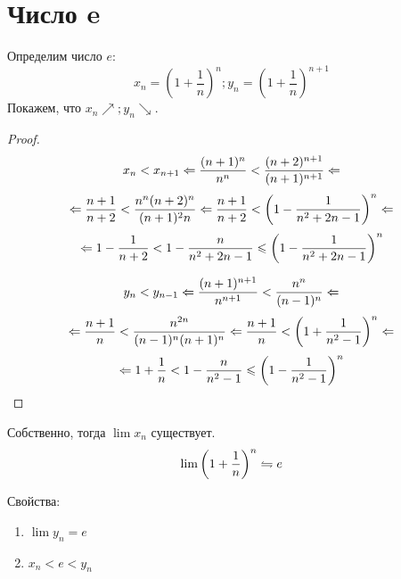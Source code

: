 ﻿\section{Число e}

Определим число $e$:
$$x_n = \left(1+\frac1n\right)^n; y_n=\left(1+\frac1n\right)^{n+1}$$
Покажем, что $x_n \nearrow; y_n \searrow$.
\begin{proof}
$$x_n < x_{n+1} \Leftarrow \frac{(n+1)^n}{n^n} < \frac{(n+2)^{n+1}}{(n+1)^{n+1}} \Leftarrow$$
$$\Leftarrow \frac{n+1}{n+2} < \frac{n^n(n+2)^n}{(n+1)^2n} \Leftarrow \frac{n+1}{n+2} < \left(1-\frac1{n^2+2n-1}\right)^n \Leftarrow $$
$$\Leftarrow 1 - \frac{1}{n+2} < 1 - \frac{n}{n^2+2n-1} \leqslant \left(1-\frac1{n^2+2n-1}\right)^n$$

$$y_n < y_{n-1} \Leftarrow \frac{(n+1)^{n+1}}{n^{n+1}} < \frac{n^n}{(n-1)^n} \Leftarrow$$
$$\Leftarrow \frac{n+1}{n} < \frac{n^{2n}}{(n-1)^n(n+1)^n} \Leftarrow \frac{n+1}{n} < \left(1+\frac1{n^2-1}\right)^n \Leftarrow $$
$$\Leftarrow 1 + \frac1n < 1 - \frac{n}{n^2-1} \leqslant \left(1-\frac1{n^2-1}\right)^n$$
\end{proof}

Собственно, тогда $\lim x_n$ существует.
$$\lim \left(1+\frac1n\right)^n \leftrightharpoons e$$

Свойства:
\begin{enumerate}
\item $\lim y_n = e$
\item $x_n < e < y_n$
\end{enumerate}
